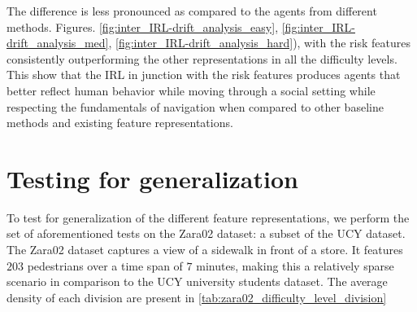 The difference is less pronounced as compared to the agents from different methods.   Figures. \ref{fig:inter_IRL-drift_analysis_easy}, \ref{fig:inter_IRL-drift_analysis_med}, \ref{fig:inter_IRL-drift_analysis_hard}), with the risk features consistently outperforming the other representations in all the difficulty levels. This show that the IRL in junction with the risk features produces agents that better reflect human behavior while moving through a social setting while respecting the fundamentals of navigation when compared to other baseline methods and existing feature representations.


\section{Testing for generalization}
\label{sec:generalization}
To test for generalization of the different feature representations, we perform the set of aforementioned tests on the Zara02 dataset: a subset of the UCY dataset. The Zara02 dataset captures a view of a sidewalk in front of a store. It features $203$ pedestrians over a time span of $7$ minutes, making this a relatively sparse scenario in comparison to the UCY university students dataset.  The average density of each division are present in \autoref{tab:zara02_difficulty_level_division}

